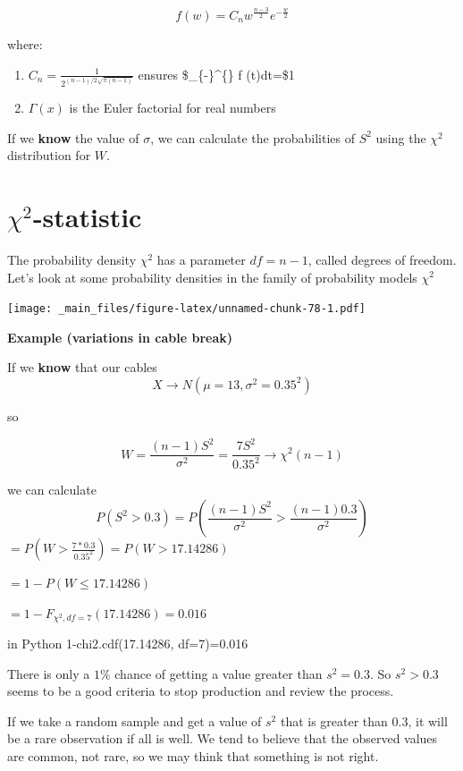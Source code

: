 \documentclass[
]{book}
\providecommand{\tightlist}{%
  \setlength{\itemsep}{0pt}\setlength{\parskip}{0pt}}
\begin{document}
\[f(w)=C_n w^{\frac{n-3}{2}} e^{-\frac{w}{2}}\]

where:

\begin{enumerate}
\def\labelenumi{\arabic{enumi})}
\tightlist
\item
  \(C_n=\frac{1}{2^{(n-1)/2\sqrt{\pi(n-1)}}}\) ensures \$\int\_\{-\infty\}\^{}\{\infty\} f (t)dt=\$1
\item
  \(\Gamma(x)\) is the Euler factorial for real numbers
\end{enumerate}

If we \textbf{know} the value of \(\sigma\), we can calculate the probabilities of \(S^2\) using the \(\chi^2\) distribution for \(W\).

\hypertarget{chi2-statistic}{%
\section{\texorpdfstring{\(\chi^2\)-statistic}{\textbackslash chi\^{}2-statistic}}\label{chi2-statistic}}

The probability density \(\chi^2\) has a parameter \(df=n-1\), called degrees of freedom. Let's look at some probability densities in the family of probability models \(\chi^2\)

\texttt{[image: \_main\_files/figure-latex/unnamed-chunk-78-1.pdf]}

\textbf{Example (variations in cable break)}

If we \textbf{know} that our cables
\[X \rightarrow N(\mu=13, \sigma^2=0.35^2)\]

so

\[W=\frac{(n-1)S^2}{\sigma^2}= \frac{7S^2}{0.35^2} \rightarrow \chi^2(n-1)\]

we can calculate \[P(S^2 > 0.3)=P(\frac{(n-1)S^2}{\sigma^2} > \frac{(n-1)0.3}{\sigma^2 } )\]
\(=P(W > \frac{7*0.3}{0.35^2})=P(W > 17.14286)\)

\(=1-P(W \leq 17.14286)\)

\(= 1- F_{\chi^2,df=7}(17.14286)=0.016\)

in Python
1-chi2.cdf(17.14286, df=7)=0.016

There is only a \(1\%\) chance of getting a value greater than \(s^2=0.3\). So \(s^2>0.3\) seems to be a good criteria to stop production and review the process.

If we take a random sample and get a value of \(s ^2\) that is greater than \(0.3\), it will be a rare observation if all is well. We tend to believe that the observed values are common, not rare, so we may think that something is not right.
\end{document}
